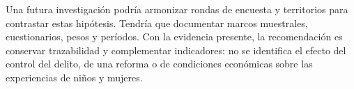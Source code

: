 Una futura investigación podría armonizar rondas de encuesta y territorios
para contrastar estas hipótesis. Tendría que documentar marcos muestrales,
cuestionarios, pesos y períodos. Con la evidencia presente, la recomendación
es conservar trazabilidad y complementar indicadores: no se identifica el
efecto del control del delito, de una reforma o de condiciones económicas
sobre las experiencias de niños y mujeres.
